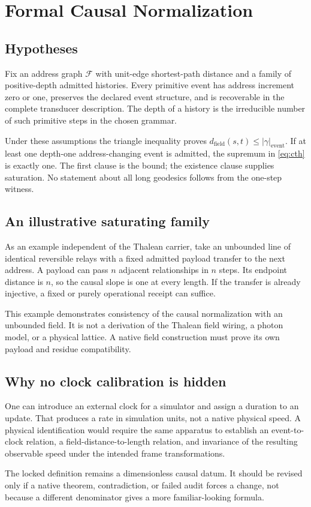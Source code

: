 \section{Formal Causal Normalization}
\label{app:causality}
\subsection{Hypotheses}
Fix an address graph $\mathcal F$ with unit-edge shortest-path distance and a family of positive-depth admitted histories. Every primitive event has address increment zero or one, preserves the declared event structure, and is recoverable in the complete transducer description. The depth of a history is the irreducible number of such primitive steps in the chosen grammar.

Under these assumptions the triangle inequality proves $d_{\mathrm{field}}(s,t)\leq|\gamma|_{\mathrm{event}}$. If at least one depth-one address-changing event is admitted, the supremum in \eqref{eq:cth} is exactly one. The first clause is the bound; the existence clause supplies saturation. No statement about all long geodesics follows from the one-step witness.

\subsection{An illustrative saturating family}
As an example independent of the Thalean carrier, take an unbounded line of identical reversible relays with a fixed admitted payload transfer to the next address. A payload can pass $n$ adjacent relationships in $n$ steps. Its endpoint distance is $n$, so the causal slope is one at every length. If the transfer is already injective, a fixed or purely operational receipt can suffice.

This example demonstrates consistency of the causal normalization with an unbounded field. It is not a derivation of the Thalean field wiring, a photon model, or a physical lattice. A native field construction must prove its own payload and residue compatibility.

\subsection{Why no clock calibration is hidden}
One can introduce an external clock for a simulator and assign a duration to an update. That produces a rate in simulation units, not a native physical speed. A physical identification would require the same apparatus to establish an event-to-clock relation, a field-distance-to-length relation, and invariance of the resulting observable speed under the intended frame transformations.

The locked definition remains a dimensionless causal datum. It should be revised only if a native theorem, contradiction, or failed audit forces a change, not because a different denominator gives a more familiar-looking formula.
